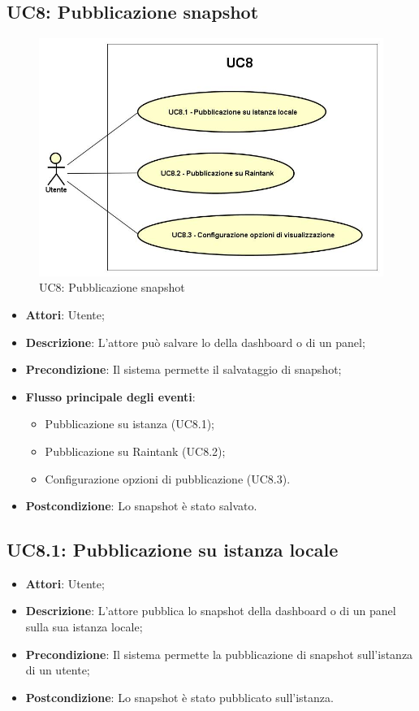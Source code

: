 \subsection{UC8: Pubblicazione snapshot}
\begin{figure} [H]
	\centering
	\includegraphics[scale=0.45]{Img/UC8}
	\caption{UC8: Pubblicazione snapshot}\label{}
\end{figure}
\begin{itemize}
	\item \textbf{Attori}: Utente;
	\item \textbf{Descrizione}: L'attore può salvare lo  della dashboard o di un panel;
	\item \textbf{Precondizione}: Il sistema permette il salvataggio di snapshot;
	\item \textbf{Flusso principale degli eventi}:
	\begin{itemize}
		\item Pubblicazione su istanza (UC8.1);
		\item Pubblicazione su Raintank (UC8.2);
		\item Configurazione opzioni di pubblicazione (UC8.3).
	\end{itemize}
	\item \textbf{Postcondizione}: Lo snapshot è stato salvato.
\end{itemize}

\subsection{UC8.1: Pubblicazione su istanza locale}
\begin{itemize}
	\item \textbf{Attori}: Utente;
	\item \textbf{Descrizione}: L'attore pubblica lo snapshot della dashboard o di un panel sulla sua istanza locale;
	\item \textbf{Precondizione}: Il sistema permette la pubblicazione di snapshot sull'istanza di un utente;
	\item \textbf{Postcondizione}: Lo snapshot è stato pubblicato sull'istanza.
\end{itemize}

